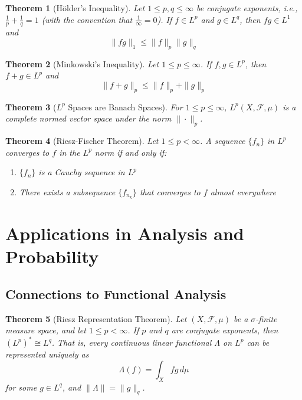 \documentclass[12pt,a4paper]{article}
\theoremstyle{plain}
\newtheorem{theorem}{Theorem}[section]
\theoremstyle{definition}
\begin{document}
\begin{theorem}[Hölder's Inequality]
Let $1 \leq p, q \leq \infty$ be conjugate exponents, i.e., $\frac{1}{p} + \frac{1}{q} = 1$ (with the convention that $\frac{1}{\infty} = 0$). If $f \in L^p$ and $g \in L^q$, then $fg \in L^1$ and
\begin{equation}
\|fg\|_1 \leq \|f\|_p \|g\|_q
\end{equation}
\end{theorem}

\begin{theorem}[Minkowski's Inequality]
Let $1 \leq p \leq \infty$. If $f, g \in L^p$, then $f + g \in L^p$ and
\begin{equation}
\|f + g\|_p \leq \|f\|_p + \|g\|_p
\end{equation}
\end{theorem}

\begin{theorem}[$L^p$ Spaces are Banach Spaces]
For $1 \leq p \leq \infty$, $L^p(X, \mathcal{F}, \mu)$ is a complete normed vector space under the norm $\|\cdot\|_p$.
\end{theorem}

\begin{theorem}[Riesz-Fischer Theorem]
Let $1 \leq p < \infty$. A sequence $\{f_n\}$ in $L^p$ converges to $f$ in the $L^p$ norm if and only if:
\begin{enumerate}[label=(\roman*)]
\item $\{f_n\}$ is a Cauchy sequence in $L^p$
\item There exists a subsequence $\{f_{n_k}\}$ that converges to $f$ almost everywhere
\end{enumerate}
\end{theorem}

\section{Applications in Analysis and Probability}

\subsection{Connections to Functional Analysis}

\begin{theorem}[Riesz Representation Theorem]
Let $(X, \mathcal{F}, \mu)$ be a $\sigma$-finite measure space, and let $1 \leq p < \infty$. If $p$ and $q$ are conjugate exponents, then $(L^p)^* \cong L^q$. That is, every continuous linear functional $\Lambda$ on $L^p$ can be represented uniquely as
\begin{equation}
\Lambda(f) = \int_X fg \, d\mu
\end{equation}
for some $g \in L^q$, and $\|\Lambda\| = \|g\|_q$.
\end{theorem}
\end{document}
